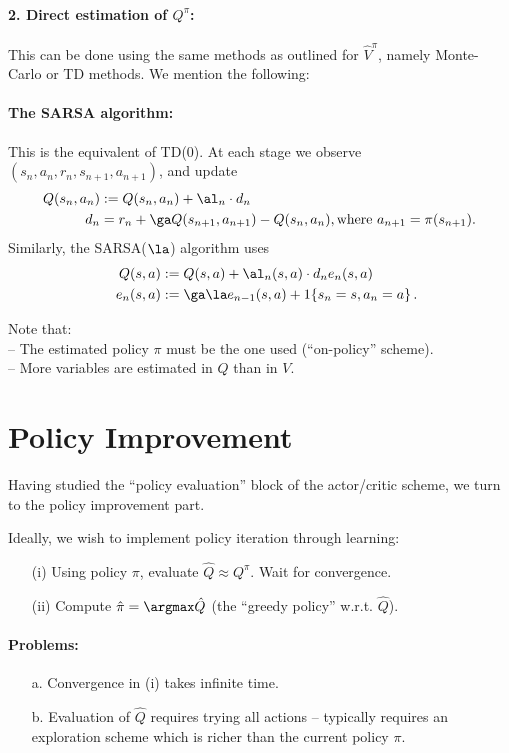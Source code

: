 \paragraph{2. Direct estimation of $Q^{\pi}$:}
This can be done using the same methods as outlined for $\hat V^{\pi}$,
namely Monte-Carlo or TD methods. We mention the following:

\paragraph{The SARSA algorithm:} This is the equivalent of TD(0).
At each stage we observe $(s_n,a_n,r_n,s_{n+1},a_{n+1})$, and update
\begin{align*}
Q(s_n, a_n) & := Q(s_n,a_n) + \al_n \cdot d_n \\
d_n & = r_n +  \ga Q(s_{n+1}, a_{n+1}) - Q(s_n, a_n), \mbox{where } a_{n+1}=\pi(s_{n+1}).
\end{align*}
Similarly, the SARSA($\la$) algorithm uses
\begin{align*}
Q(s, a) & := Q(s,a) + \al_n(s,a) \cdot d_n e_n(s,a) \\
\quad e_n(s,a)& := \ga \la e_{n-1}(s,a)+1\{s_n=s,a_n=a\} \,.
\end{align*}

Note that:\\
-- The estimated policy $\pi$ must be the one used (``on-policy'' scheme).\\
-- More variables are estimated in $Q$ than in $V$.




\section{Policy Improvement}

Having studied the ``policy evaluation'' block of the actor/critic scheme, we
turn to the policy improvement part.

Ideally, we wish to implement policy iteration through learning:
\begin{itemize} 
\item[(i)]
Using policy $\pi$, evaluate $\hat Q \approx Q^{\pi}$.  Wait for convergence.
\item[(ii)]
Compute $\hat \pi = \argmax \hat Q$ (the ``greedy policy'' w.r.t. $\hat Q$).
\end{itemize}

\paragraph{Problems:}
\begin{itemize}
\item[a.]
Convergence in (i) takes infinite time.
\item[b.]
Evaluation of $\hat Q$ requires trying all actions -- typically requires
an exploration scheme which is richer than the current policy $\pi$.
\end{itemize}

